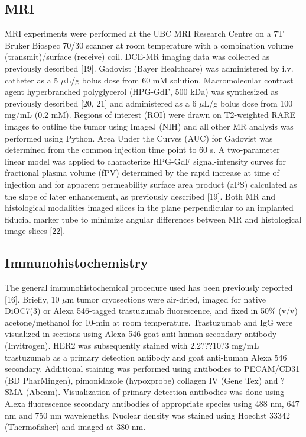 \subsection{MRI}
MRI experiments were performed at the UBC MRI Research Centre on a 7T Bruker Biospec 70/30 scanner at room temperature with a combination volume (transmit)/surface (receive) coil.
DCE-MR imaging data was collected as previously described [19].
Gadovist (Bayer Healthcare) was administered by i.v.
catheter as a 5 $\mu$L/g bolus dose from 60 mM solution.
Macromolecular contrast agent hyperbranched polyglycerol (HPG-GdF, 500 kDa) was synthesized as previously described [20, 21] and administered as a 6 $\mu$L/g bolus dose from 100 mg/mL (0.2 mM).
Regions of interest (ROI) were drawn on T2-weighted RARE images to outline the tumor using ImageJ (NIH) and all other MR analysis was performed using Python.
Area Under the Curves (AUC) for Gadovist was determined from the common injection time point to 60 s.
A two-parameter linear model was applied to characterize HPG-GdF signal-intensity curves for fractional plasma volume (fPV) determined by the rapid increase at time of injection and for apparent permeability surface area product (aPS) calculated as the slope of later enhancement, as previously described [19].
Both MR and histological modalities imaged slices in the plane perpendicular to an implanted fiducial marker tube to minimize angular differences between MR and histological image slices [22].

\subsection{Immunohistochemistry}
The general immunohistochemical procedure used has been previously reported [16].
Briefly, 10 $\mu$m tumor cryosections were air-dried, imaged for native DiOC7(3) or Alexa 546-tagged trastuzumab fluorescence, and fixed in 50\% (v/v) acetone/methanol for 10-min at room temperature.
Trastuzumab and IgG were visualized in sections using Alexa 546 goat anti-human secondary antibody (Invitrogen).
HER2 was subsequently stained with 2.2???10?3 mg/mL trastuzumab as a primary detection antibody and goat anti-human Alexa 546 secondary.
Additional staining was performed using antibodies to PECAM/CD31 (BD PharMingen), pimonidazole (hypoxprobe) collagen IV (Gene Tex) and ?SMA (Abcam).
Visualization of primary detection antibodies was done using Alexa fluorescence secondary antibodies of appropriate species using 488 nm, 647 nm and 750 nm wavelengths.
Nuclear density was stained using Hoechst 33342 (Thermofisher) and imaged at 380 nm.

